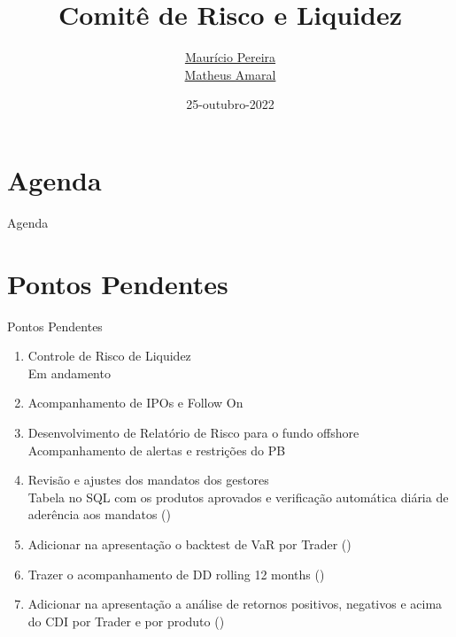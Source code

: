\documentclass[t,aspectratio=169]{beamer}
\title[Comitê de Risco]{
	Comitê de Risco e Liquidez}
\date{25-outubro-2022}
\author[\href{mailto:risco@asset1.com.br}{risco@asset1.com.br}]{
	\href{mailto:mauricio.pereira@asset1.com.br}{Maurício Pereira}\\
	\vspace{0.12cm}
	\href{mailto:matheus.amaral@asset1.com.br}{Matheus Amaral}
}
\begin{document}

{
	\begin{frame}
		\maketitle
	\end{frame}
}

\section*{Agenda}
\begin{frame}{Agenda}
	\tableofcontents
\end{frame}

\section[Pendências]{Pontos Pendentes}
\begin{frame}{Pontos Pendentes}
	\begin{enumerate}
		\item Controle de Risco de Liquidez\\
		Em andamento
		
		\item {\color{blue1}Acompanhamento de IPOs e Follow On}
		
		\item {\color{blue1}Desenvolvimento de Relatório de Risco para o fundo offshore}\\
		Acompanhamento de alertas e restrições do PB
		
		\item Revisão e ajustes dos mandatos dos gestores\\
		Tabela no SQL com os produtos aprovados e verificação automática diária de aderência aos mandatos ({\color{green}\checkmark}) 
		
		\item Adicionar na apresentação o backtest de VaR por Trader ({\color{green}\checkmark}) 
		
		\item Trazer o acompanhamento de DD rolling 12 months ({\color{green}\checkmark}) 
		
		\item Adicionar na apresentação a análise de retornos positivos, negativos e acima do CDI por Trader e por produto ({\color{green}\checkmark}) 
		
	\end{enumerate}
\end{frame}
\end{document}
